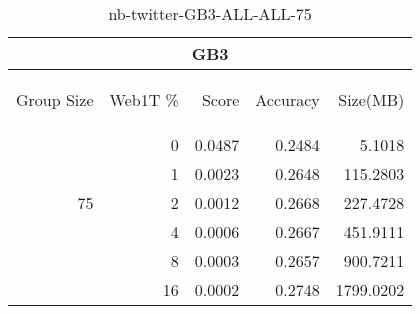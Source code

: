 \begin{center}
\begin{table}[htbp] 
 \begin{center}
\begin{tabular}{ | r | r | r | r | r |}
\hline
\multicolumn{5}{|c|}{GB3}\\
\hline
\begin{sideways}Group Size\end{sideways} & \begin{sideways}Web1T \%\end{sideways} & \begin{sideways}Score\end{sideways} & \begin{sideways}Accuracy\end{sideways} & \begin{sideways}Size(MB)\end{sideways}\\
\hline
\multirow{5}{*}{75}
 & 0 & 0.0487 & 0.2484 & 5.1018\\ \cline{2-5}
 & 1 & 0.0023 & 0.2648 & 115.2803\\ \cline{2-5}
 & 2 & 0.0012 & 0.2668 & 227.4728\\ \cline{2-5}
 & 4 & 0.0006 & 0.2667 & 451.9111\\ \cline{2-5}
 & 8 & 0.0003 & 0.2657 & 900.7211\\ \cline{2-5}
 & 16 & 0.0002 & 0.2748 & 1799.0202\\ \cline{2-5}
\hline
\end{tabular}
\caption{nb-twitter-GB3-ALL-ALL-75}
\label{table:nb-twitter-GB3-ALL-ALL-75}
\end{center}
 \end{table}
\end{center}

